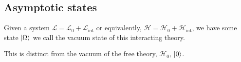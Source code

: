 \subsection{Asymptotic states}

Given a system $\mathcal{L} = \mathcal{L}_0 + \mathcal{L}_\text{int}$ or equivalently, $\mathcal{H} = \mathcal{H}_0 + \mathcal{H}_\text{int}$, we have some state $\ket{\Omega}$ we call the vacuum state of this interacting theory.

\begin{note}
    This is distinct from the vacuum of the free theory, $\mathcal{H}_0$, $\ket{0}$.
\end{note}













